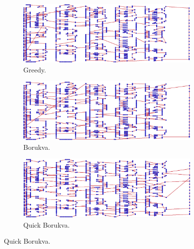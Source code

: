 \documentclass[13pt,a4paper]{article}
\begin{document}
\begin{figure}[t]
    \centering 
    \begin{subfigure}[t]{0.3\textwidth}
      \centering
      \includegraphics[width=\textwidth]{img/2/G.png}
      \caption{Greedy.}
    \end{subfigure}
    \begin{subfigure}[t]{0.3\textwidth}
        \centering
        \includegraphics[width=\textwidth]{img/2/B.png}
        \caption{Borukva.}
    \end{subfigure}
    \begin{subfigure}[t]{0.3\textwidth}
      \centering
      \includegraphics[width=\textwidth]{img/2/Q.png}
      \caption{Quick Borukva.}
    \end{subfigure}


\end{figure}
\end{document}
